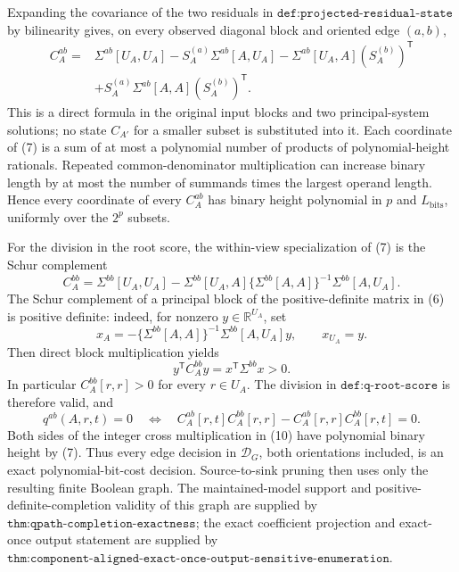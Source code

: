 Expanding the covariance of the two residuals in \(\texttt{def:projected-residual-state}\) by bilinearity gives, on every observed diagonal block and oriented edge \((a,b)\),
\[
 \begin{aligned}
 C_A^{ab}
 ={}&\Sigma^{ab}[U_A,U_A]
 -S_A^{(a)}\Sigma^{ab}[A,U_A]
 -\Sigma^{ab}[U_A,A](S_A^{(b)})^{\mathsf T}\\
 &+S_A^{(a)}\Sigma^{ab}[A,A](S_A^{(b)})^{\mathsf T}.
 \end{aligned}
\tag{7}
\]
This is a direct formula in the original input blocks and two principal-system solutions; no state \(C_{A'}\) for a smaller subset is substituted into it.  Each coordinate of (7) is a sum of at most a polynomial number of products of polynomial-height rationals.  Repeated common-denominator multiplication can increase binary length by at most the number of summands times the largest operand length.  Hence every coordinate of every \(C_A^{ab}\) has binary height polynomial in \(p\) and \(L_{\mathrm{bits}}\), uniformly over the \(2^p\) subsets.

For the division in the root score, the within-view specialization of (7) is the Schur complement
\[
 C_A^{bb}
 =\Sigma^{bb}[U_A,U_A]
 -\Sigma^{bb}[U_A,A]
  \{\Sigma^{bb}[A,A]\}^{-1}
  \Sigma^{bb}[A,U_A].
\tag{8}
\]
The Schur complement of a principal block of the positive-definite matrix in (6) is positive definite: indeed, for nonzero \(y\in\mathbb R^{U_A}\), set
\[
 x_A=-\{\Sigma^{bb}[A,A]\}^{-1}
       \Sigma^{bb}[A,U_A]y,
 \qquad x_{U_A}=y.
\]
Then direct block multiplication yields
\[
 y^{\mathsf T}C_A^{bb}y
 =x^{\mathsf T}\Sigma^{bb}x>0.
\tag{9}
\]
In particular \(C_A^{bb}[r,r]>0\) for every \(r\in U_A\).  The division in \(\texttt{def:q-root-score}\) is therefore valid, and
\[
 q^{ab}(A,r,t)=0
 \quad\Longleftrightarrow\quad
 C_A^{ab}[r,t]C_A^{bb}[r,r]
 -C_A^{ab}[r,r]C_A^{bb}[r,t]=0.
\tag{10}
\]
Both sides of the integer cross multiplication in (10) have polynomial binary height by (7).  Thus every edge decision in \(\mathcal D_G\), both orientations included, is an exact polynomial-bit-cost decision.  Source-to-sink pruning then uses only the resulting finite Boolean graph.  The maintained-model support and positive-definite-completion validity of this graph are supplied by \(\texttt{thm:qpath-completion-exactness}\); the exact coefficient projection and exact-once output statement are supplied by \(\texttt{thm:component-aligned-exact-once-output-sensitive-enumeration}\).

